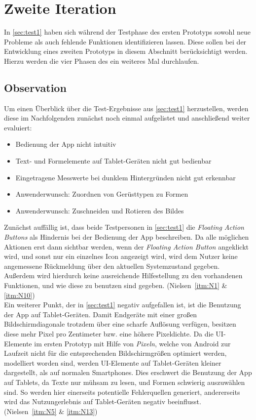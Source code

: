 \chapter{Zweite Iteration}\label{chap:pro2}
In \autoref{sec:test1} haben sich während der Testphase des ersten Prototyps sowohl neue Probleme als auch fehlende Funktionen identifizieren lassen.
Diese sollen bei der Entwicklung eines zweiten Prototyps in diesem Abschnitt berücksichtigt werden. 
Hierzu werden die vier Phasen des \hcdp{} ein weiteres Mal durchlaufen.

\section{Observation}
Um einen Überblick über die Test-Ergebnisse aus \autoref{sec:test1} herzustellen, werden diese im Nachfolgenden zunächst noch einmal aufgelistet und anschließend weiter evaluiert:

\begin{itemize}
  \item Bedienung der App nicht intuitiv
  \item Text- und Formelemente auf Tablet-Geräten nicht gut bedienbar
  \item Eingetragene Messwerte bei dunklem Hintergründen nicht gut erkennbar
  \item Anwenderwunsch: Zuordnen von Gerüsttypen zu Formen
  \item Anwenderwunsch: Zuschneiden und Rotieren des Bildes
\end{itemize}

\noindent
Zunächst auffällig ist, dass beide Testpersonen in \autoref{sec:test1} die \emph{Floating Action Buttons} als Hindernis bei der Bedienung der App beschreiben.
Da alle möglichen Aktionen erst dann sichtbar werden, wenn der \emph{Floating Action Button} angeklickt wird, und sonst nur ein einzelnes Icon angezeigt wird, wird dem Nutzer keine angemessene Rückmeldung über den aktuellen Systemzustand gegeben.
Außerdem wird hierdurch keine ausreichende Hilfestellung zu den vorhandenen Funktionen, und wie diese zu benutzen sind gegeben.
(Nielsen~\autoref{itm:N1} \& \autoref{itm:N10}) \\

Ein weiterer Punkt, der in \autoref{sec:test1} negativ aufgefallen ist, ist die Benutzung der App auf Tablet-Geräten.
Damit Endgeräte mit einer großen Bildschirmdiagonale trotzdem über eine scharfe Auflösung verfügen, besitzen diese mehr Pixel pro Zentimeter bzw. eine höhere Pixeldichte.
Da die UI-Elemente im ersten Prototyp mit Hilfe von \emph{Pixeln}, welche von Android zur Laufzeit nicht für die entsprechenden Bildschirmgrößen optimiert werden, modelliert worden sind, werden UI-Elemente auf Tablet-Geräten kleiner dargestellt, als auf normalen Smartphones.
Dies erschwert die Benutzung der App auf Tablets, da Texte nur mühsam zu lesen, und Formen schwierig auszuwählen sind.
So werden hier einerseits potentielle Fehlerquellen generiert, andererseits wird das Nutzungerlebnis auf Tablet-Geräten negativ beeinflusst.
(Nielsen~\autoref{itm:N5} \& \autoref{itm:N13}) \\

